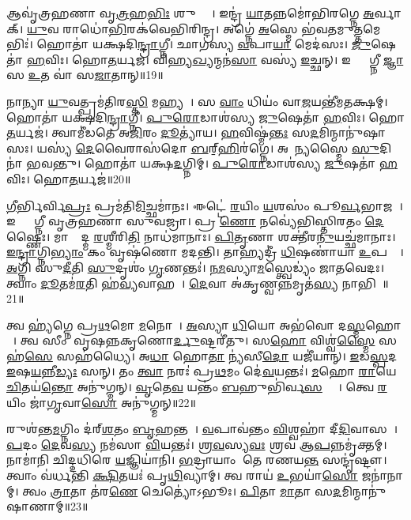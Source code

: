 𑌆𑌵𑍃॑𑌤𑍍𑌰𑌹𑌣𑌾 𑌵𑍃\ul{𑌤𑍍𑌰}𑌹\ul{𑌭𑌿𑌃} 𑌶𑍁𑌷𑍍𑌮𑍈𑌃᳚।
𑌇𑌨𑍍𑌦𑍍𑌰॑ \ul{𑌯𑌾}𑌤𑌨𑍍𑌨𑌮𑍋॑𑌭𑌿𑌰𑌗𑍍𑌨𑍇 \ul{𑌅}𑌰𑍍𑌵𑌾𑌕𑍍।
\ul{𑌯𑍁}𑌵 𑌰𑌾𑌧𑍋॑\ul{𑌭𑌿}𑌰𑌕॑𑌵𑍇𑌭𑌿𑌰𑌿𑌨𑍍𑌦𑍍𑌰।
𑌅𑌗𑍍𑌨𑍇॑ \ul{𑌅}𑌸𑍍𑌮𑍇 𑌭॑𑌵𑌤𑌮𑍁\ul{𑌤𑍍𑌤}𑌮𑍇𑌭𑌿𑌃॑।
𑌹𑍋𑌤𑌾॑ 𑌯𑌕𑍍𑌷𑌦𑌿\ul{𑌨𑍍𑌦𑍍𑌰𑌾}𑌗𑍍𑌨𑍀।
𑌛𑌾𑌗॑𑌸𑍍𑌯 \ul{𑌵}𑌪𑌾\ul{𑌯𑌾} 𑌮𑍇𑌦॑𑌸𑌃।
\ul{𑌜𑍁}𑌷𑍇𑌤𑌾॑ \ul{𑌹}𑌵𑌿𑌃।
𑌹𑍋\ul{𑌤}𑌰𑍍𑌯𑌜॑।
𑌵𑌿𑌹𑍍𑌯\ul{𑌖𑍍𑌯}𑌨𑍍𑌮𑌨॑\ul{𑌸𑌾} 𑌵𑌸𑍍𑌯॑ \ul{𑌇}𑌚𑍍𑌛𑌨𑍍।
𑌇𑌨𑍍𑌦𑍍𑌰𑌾᳚𑌗𑍍𑌨𑍀 \ul{𑌜𑍍𑌞𑌾}𑌸 \ul{𑌉}𑌤 𑌵𑌾॑ 𑌸\ul{𑌜𑌾}𑌤𑌾𑌨𑍍॥19॥

𑌨𑌾𑌨𑍍𑌯𑌾 \ul{𑌯𑍁}𑌵𑌤𑍍𑌪𑍍𑌰𑌮॑𑌤𑌿𑌰\ul{𑌸𑍍𑌤𑌿} 𑌮𑌹𑍍𑌯𑌮𑍍᳚।
𑌸 \ul{𑌵𑌾𑌂} 𑌧𑌿𑌯𑌂॑ 𑌵𑌾\ul{𑌜}𑌯𑌨𑍍𑌤𑍀॑𑌮𑌤𑌕𑍍𑌷𑌮𑍍।
𑌹𑍋𑌤𑌾॑ 𑌯𑌕𑍍𑌷𑌦𑌿\ul{𑌨𑍍𑌦𑍍𑌰𑌾}𑌗𑍍𑌨𑍀।
\ul{𑌪𑍁}\ul{𑌰𑍋}𑌡𑌾𑌶॑𑌸𑍍𑌯 \ul{𑌜𑍁}𑌷𑍇𑌤𑌾॑ \ul{𑌹}𑌵𑌿𑌃।
𑌹𑍋\ul{𑌤}𑌰𑍍𑌯𑌜॑।
𑌤𑍍𑌵𑌾𑌮𑍀॑𑌡𑌤𑍇 𑌅\ul{𑌜𑌿}𑌰𑌂 \ul{𑌦𑍂}𑌤𑍍𑌯𑌾॑𑌯।
\ul{𑌹}𑌵𑌿𑌷𑍍𑌮॑\ul{𑌨𑍍𑌤𑌃} 𑌸\ul{𑌦}𑌮𑌿𑌨𑍍𑌮𑌾𑌨𑍁॑𑌷𑌾𑌸𑌃।
𑌯𑌸𑍍𑌯॑ \ul{𑌦𑍇}𑌵𑍈𑌰𑌾𑌸॑𑌦𑍋 \ul{𑌬}𑌰𑍍‌॒\mbox{}\ul{𑌹𑌿}𑌰॑𑌗𑍍𑌨𑍇।
𑌅𑌹𑌾᳚𑌨𑍍𑌯𑌸𑍍𑌮𑍈 \ul{𑌸𑍁}𑌦𑌿𑌨𑌾॑ 𑌭𑌵𑌨𑍍𑌤𑍁।
𑌹𑍋𑌤𑌾॑ 𑌯𑌕𑍍𑌷\ul{𑌦}𑌗𑍍𑌨𑌿𑌮𑍍।
\ul{𑌪𑍁}\ul{𑌰𑍋}𑌡𑌾𑌶॑𑌸𑍍𑌯 \ul{𑌜𑍁}𑌷𑌤𑌾॑ \ul{𑌹}𑌵𑌿𑌃।
𑌹𑍋\ul{𑌤}𑌰𑍍𑌯𑌜॑॥20॥\anuvakamend[\ul{𑌸}\ul{𑌜𑌾}𑌤𑌾\ul{𑌨}𑌗𑍍𑌨𑌿𑌨𑍍𑌦𑍍𑌵𑍇 𑌚॑]

\ul{𑌗𑍀}𑌰𑍍𑌭𑌿𑌰𑍍𑌵𑌿\ul{𑌪𑍍𑌰𑌃} 𑌪𑍍𑌰𑌮॑𑌤𑌿\ul{𑌮𑌿}𑌚𑍍𑌛𑌮𑌾॑𑌨𑌃।
𑌈𑌟𑍍𑌟𑍇॑ \ul{𑌰}𑌯𑌿𑌂 \ul{𑌯}𑌶𑌸𑌂॑ 𑌪𑍂\ul{𑌰𑍍𑌵}𑌭𑌾𑌜𑌮𑍍᳚।
𑌇𑌨𑍍𑌦𑍍𑌰𑌾᳚𑌗𑍍𑌨𑍀 𑌵𑍃𑌤𑍍𑌰𑌹𑌣𑌾 𑌸𑍁𑌵𑌜𑍍𑌰𑌾।
𑌪𑍍𑌰 \ul{𑌣𑍋} 𑌨𑌵𑍍𑌯𑍇॑𑌭𑌿𑌸𑍍𑌤𑌿𑌰𑌤𑌂 \ul{𑌦𑍇}𑌷𑍍𑌣𑍈𑌃।
𑌮𑌾𑌚𑍍𑌛𑍇᳚𑌦𑍍𑌮 \ul{𑌰}𑌶𑍍𑌮𑍀𑌰𑌿\ul{𑌤𑌿} 𑌨𑌾𑌧॑𑌮𑌾𑌨𑌾𑌃।
\ul{𑌪𑌿}\ul{𑌤𑍃}𑌣𑌾 𑌶𑌕𑍍𑌤𑍀॑𑌰\ul{𑌨𑍁}𑌯𑌚𑍍𑌛॑𑌮𑌾𑌨𑌾𑌃।
\ul{𑌇}\ul{𑌨𑍍𑌦𑍍𑌰𑌾}𑌗𑍍𑌨𑌿\ul{𑌭𑍍𑌯𑌾𑌂} 𑌕𑌂 𑌵𑍃𑌷॑𑌣𑍋 𑌮𑌦𑌨𑍍𑌤𑌿।
𑌤𑌾𑌹𑍍𑌯𑌦𑍍𑌰𑍀॑ \ul{𑌧𑌿}𑌷𑌣𑌾॑𑌯𑌾 \ul{𑌉}𑌪𑌸𑍍𑌥𑍇᳚।
\ul{𑌅}𑌗𑍍𑌨𑌿 𑌸𑍁॑\ul{𑌦𑍀}𑌤𑌿 \ul{𑌸𑍁}𑌦𑍃𑌶𑌂॑ \ul{𑌗𑍃}𑌣𑌨𑍍𑌤𑌃॑।
\ul{𑌨}\ul{𑌮}𑌸𑍍𑌯𑌾\ul{𑌮}𑌸𑍍𑌤𑍍𑌵𑍇𑌡𑍍𑌯𑌂॑ 𑌜𑌾𑌤𑌵𑍇𑌦𑌃।
𑌤𑍍𑌵𑌾𑌂 \ul{𑌦𑍂}𑌤𑌮॑\ul{𑌰}𑌤𑌿 𑌹॑\ul{𑌵𑍍𑌯}𑌵𑌾𑌹𑌮𑍍᳚।
\ul{𑌦𑍇}𑌵𑌾 𑌅॑𑌕𑍃𑌣𑍍𑌵\ul{𑌨𑍍𑌨}𑌮𑍃𑌤॑\ul{𑌸𑍍𑌯} 𑌨𑌾𑌭𑌿𑌮𑍍᳚॥21॥\anuvakamend[\ul{𑌜𑌾}\ul{𑌤}\ul{𑌵𑍇}\ul{𑌦𑍋} 𑌦𑍍𑌵𑍇 𑌚॑]

𑌤𑍍𑌵 𑌹𑍍𑌯॑𑌗𑍍𑌨𑍇 𑌪𑍍𑌰\ul{𑌥}𑌮𑍋 \ul{𑌮}𑌨𑍋𑌤𑌾᳚।
\ul{𑌅}𑌸𑍍𑌯𑌾 \ul{𑌧𑌿}𑌯𑍋 𑌅𑌭॑𑌵𑍋 𑌦\ul{𑌸𑍍𑌮}𑌹𑍋𑌤𑌾᳚।
𑌤𑍍𑌵 𑌸𑍀𑌂 𑌵𑍃𑌷𑌨𑍍𑌨𑌕𑍃𑌣𑍋\ul{𑌰𑍍𑌦𑍁}𑌷𑍍𑌟𑌰𑍀॑𑌤𑍁।
𑌸\ul{𑌹𑍋} 𑌵𑌿𑌶𑍍𑌵॑\ul{𑌸𑍍𑌮𑍈} 𑌸𑌹॑\ul{𑌸𑍇} 𑌸𑌹॑𑌧𑍍𑌯𑍈।
𑌅\ul{𑌧𑌾} 𑌹𑍋\ul{𑌤𑌾} 𑌨𑍍𑌯॑𑌸𑍀\ul{𑌦𑍋} 𑌯𑌜𑍀॑𑌯𑌾𑌨𑍍।
\ul{𑌇}𑌡\ul{𑌸𑍍𑌪}𑌦 \ul{𑌇}𑌷\ul{𑌯}𑌨𑍍𑌨𑍀\ul{𑌡𑍍𑌯𑌃} 𑌸𑌨𑍍।
𑌤𑌂 \ul{𑌤𑍍𑌵𑌾} 𑌨𑌰𑌃॑ 𑌪𑍍𑌰\ul{𑌥}𑌮𑌂 𑌦𑍇॑\ul{𑌵}𑌯𑌨𑍍𑌤𑌃॑।
\ul{𑌮}𑌹𑍋 \ul{𑌰𑌾}𑌯𑍇 \ul{𑌚𑌿}𑌤𑌯॑\ul{𑌨𑍍𑌤𑍋} 𑌅𑌨𑍁॑𑌗𑍍𑌮𑌨𑍍।
\ul{𑌵𑍃}𑌤𑍇\ul{𑌵} 𑌯𑌨𑍍𑌤𑌂॑ \ul{𑌬}𑌹𑍁𑌭𑌿॑𑌰𑍍𑌵\ul{𑌸}𑌵𑍍𑌯𑍈𑌃᳚।
𑌤𑍍𑌵𑍇 \ul{𑌰}𑌯𑌿𑌂 𑌜𑌾॑\ul{𑌗𑍃}𑌵𑌾\ul{𑌸𑍋} 𑌅𑌨𑍁॑𑌗𑍍𑌮𑌨𑍍॥22॥

𑌰𑍁𑌶॑𑌨𑍍𑌤\ul{𑌮}𑌗𑍍𑌨𑌿𑌂 𑌦॑𑌰𑍍‌\mbox{}\ul{𑌶}𑌤𑌂 \ul{𑌬𑍃}𑌹𑌨𑍍𑌤𑌮𑍍᳚।
\ul{𑌵}𑌪𑌾𑌵॑𑌨𑍍𑌤𑌂 \ul{𑌵𑌿}𑌶𑍍𑌵𑌹𑌾॑ 𑌦𑍀\ul{𑌦𑌿}𑌵𑌾𑌸𑌮𑍍᳚।
\ul{𑌪}𑌦𑌂 \ul{𑌦𑍇}𑌵\ul{𑌸𑍍𑌯} 𑌨𑌮॑𑌸𑌾 \ul{𑌵𑌿}𑌯𑌨𑍍𑌤𑌃॑।
\ul{𑌶𑍍𑌰}\ul{𑌵}𑌸𑍍𑌯\ul{𑌵𑌃} 𑌶𑍍𑌰𑌵॑ 𑌆\ul{𑌪}𑌨𑍍𑌨𑌮𑍃॑𑌕𑍍𑌤𑌮𑍍।
𑌨𑌾𑌮𑌾॑𑌨𑌿 𑌚𑌿𑌦𑍍𑌦𑌧𑌿𑌰𑍇 \ul{𑌯}𑌜𑍍𑌞𑌿𑌯𑌾॑𑌨𑌿।
\ul{𑌭}𑌦𑍍𑌰𑌾𑌯𑌾𑌂 𑌤𑍇 𑌰𑌣𑌯\ul{𑌨𑍍𑌤} 𑌸𑌨𑍍𑌦𑍃॑𑌷𑍍𑌟𑍗।
𑌤𑍍𑌵𑌾𑌂 𑌵॑𑌰𑍍𑌧𑌨𑍍𑌤𑌿 \ul{𑌕𑍍𑌷𑌿}𑌤𑌯𑌃॑ 𑌪𑍃\ul{𑌥𑌿}𑌵𑍍𑌯𑌾𑌮𑍍।
𑌤𑍍𑌵 𑌰𑌾𑌯॑ \ul{𑌉}𑌭𑌯𑌾॑\ul{𑌸𑍋} 𑌜𑌨𑌾॑𑌨𑌾𑌮𑍍।
𑌤𑍍𑌵𑌂 \ul{𑌤𑍍𑌰𑌾}𑌤𑌾 𑌤॑𑌰\ul{𑌣𑍇} 𑌚𑍇𑌤𑍍𑌯𑍋॑𑌽𑌭𑍂𑌃।
\ul{𑌪𑌿}𑌤𑌾 \ul{𑌮𑌾}𑌤𑌾 𑌸\ul{𑌦}𑌮𑌿𑌨𑍍𑌮𑌾𑌨𑍁॑𑌷𑌾𑌣𑌾𑌮𑍍॥23॥

